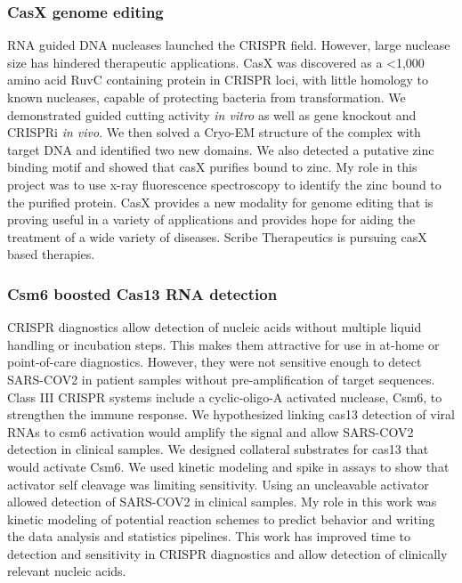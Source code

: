 \documentclass{article}
\begin{document}
\subsubsection{CasX genome editing}
RNA guided DNA nucleases launched the CRISPR field.
However, large nuclease size has hindered therapeutic applications.
CasX was discovered as a <1,000 amino acid RuvC containing protein in CRISPR loci, with little homology to known nucleases, capable of protecting bacteria from transformation.
We demonstrated guided cutting activity \textit{in vitro} as well as gene knockout and CRISPRi \textit{in vivo}.
We then solved a Cryo-EM structure of the complex with target DNA and identified two new domains.
We also detected a putative zinc binding motif and showed that casX purifies bound to zinc.
My role in this project was to use x-ray fluorescence spectroscopy to identify the zinc bound to the purified protein.
CasX provides a new modality for genome editing that is proving useful in a variety of applications and provides hope for aiding the treatment of a wide variety of diseases.
Scribe Therapeutics is pursuing casX based therapies.
%
\subsubsection{Csm6 boosted Cas13 RNA detection}
CRISPR diagnostics allow detection of nucleic acids without multiple liquid handling or incubation steps.
This makes them attractive for use in at-home or point-of-care diagnostics.
However, they were not sensitive enough to detect SARS-COV2 in patient samples without pre-amplification of target sequences.
Class III CRISPR systems include a cyclic-oligo-A activated nuclease, Csm6, to strengthen the immune response.
We hypothesized linking cas13 detection of viral RNAs to csm6 activation would amplify the signal and allow SARS-COV2 detection in clinical samples.
We designed collateral substrates for cas13 that would activate Csm6.
We used kinetic modeling and spike in assays to show that activator self cleavage was limiting sensitivity.
Using an uncleavable activator allowed detection of SARS-COV2 in clinical samples.
My role in this work was kinetic modeling of potential reaction schemes to predict behavior and writing the data analysis and statistics pipelines.
This work has improved time to detection and sensitivity in CRISPR diagnostics and allow detection of clinically relevant nucleic acids.
%

\nocite{Liu2021-pu,Liu2019-nk}
\printbibliography[heading=none]
\end{document}

